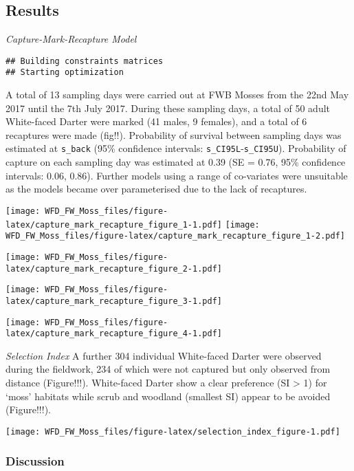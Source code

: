 \documentclass[]{article}
\begin{document}
\subsection{Results}\label{results}

\emph{Capture-Mark-Recapture Model}

\begin{verbatim}
## Building constraints matrices 
## Starting optimization
\end{verbatim}

A total of 13 sampling days were carried out at FWB Mosses from the 22nd
May 2017 until the 7th July 2017. During these sampling days, a total of
50 adult White-faced Darter were marked (41 males, 9 females), and a
total of 6 recaptures were made (fig!!). Probability of survival between
sampling days was estimated at \texttt{s\_back} (95\% confidence
intervals: \texttt{s\_CI95L}-\texttt{s\_CI95U}). Probability of capture
on each sampling day was estimated at 0.39 (SE = 0.76, 95\% confidence
intervals: 0.06, 0.86). Further models using a range of co-variates were
unsuitable as the models became over parameterised due to the lack of
recaptures.

\texttt{[image: WFD\_FW\_Moss\_files/figure-latex/capture\_mark\_recapture\_figure\_1-1.pdf]}
\texttt{[image: WFD\_FW\_Moss\_files/figure-latex/capture\_mark\_recapture\_figure\_1-2.pdf]}

\texttt{[image: WFD\_FW\_Moss\_files/figure-latex/capture\_mark\_recapture\_figure\_2-1.pdf]}

\texttt{[image: WFD\_FW\_Moss\_files/figure-latex/capture\_mark\_recapture\_figure\_3-1.pdf]}

\texttt{[image: WFD\_FW\_Moss\_files/figure-latex/capture\_mark\_recapture\_figure\_4-1.pdf]}

\emph{Selection Index} A further 304 individual White-faced Darter were
observed during the fieldwork, 234 of which were not captured but only
observed from distance (Figure!!!). White-faced Darter show a clear
preference (SI \textgreater{} 1) for `moss' habitats while scrub and
woodland (smallest SI) appear to be avoided (Figure!!!).

\texttt{[image: WFD\_FW\_Moss\_files/figure-latex/selection\_index\_figure-1.pdf]}

\subsubsection{Discussion}\label{discussion}
\end{document}
